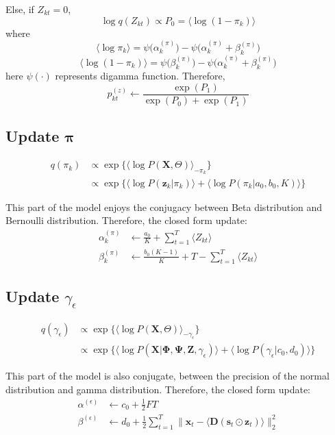 \documentclass[11pt]{article} %
\begin{document}
Else, if $Z_{kt} = 0$,
\[
\log q(Z_{kt}) \propto P_0 = \langle \log (1-\pi_k) \rangle
\]
where 
\[
\langle \log \pi_k \rangle = \psi\big(\alpha_k^{(\pi)}\big) - \psi\big(\alpha_k^{(\pi)} + \beta_k^{(\pi)}\big)
\]
\[
\langle \log(1- \pi_k) \rangle = \psi\big(\beta_k^{(\pi)}\big) - \psi\big(\alpha_k^{(\pi)} + \beta_k^{(\pi)}\big)
\]
here $\psi(\cdot)$ represents digamma function. 
Therefore, 
\[
p_{kt}^{(z)} \leftarrow \frac{\exp(P_1)}{\exp(P_0) + \exp(P_1)}
\]

\subsection{Update $\bm{\pi}$}
\begin{align*}
q(\pi_k) &\propto \exp\{\langle\log P(\mathbf{X}, \Theta)\rangle_{-\pi_k}\}\\
&\propto \exp\{\langle \log P(\bm{z}_{k} | \pi_k) \rangle + \langle \log P(\pi_k | a_0, b_0, K) \rangle \}
\end{align*}

This part of the model enjoys the conjugacy between Beta distribution and Bernoulli distribution. Therefore, the closed form update:
\begin{align*}
\alpha_k^{(\pi)} &\leftarrow \frac{a_0}{K} + \sum_{t=1}^T \langle Z_{kt} \rangle\\
\beta_k^{(\pi)} &\leftarrow \frac{b_0 (K-1)}{K} + T - \sum_{t=1}^T \langle Z_{kt} \rangle
\end{align*}

\subsection{Update $\gamma_\epsilon$}
\begin{align*}
q(\gamma_\epsilon) &\propto \exp\{\langle\log P(\mathbf{X}, \Theta)\rangle_{-\gamma_\epsilon}\}\\
&\propto \exp\{\langle \log P(\mathbf{X} | \mathbf{\Phi}, \mathbf{\Psi}, \mathbf{Z},  \gamma_\epsilon)\rangle + \langle \log P(\gamma_\epsilon | c_0, d_0) \rangle \}
\end{align*}

This part of the model is also conjugate, between the precision of the normal distribution and gamma distribution. Therefore, the closed form update:
\begin{align*}
\alpha^{(\epsilon)} &\leftarrow  c_0 + \frac{1}{2} FT\\
\beta^{(\epsilon)} &\leftarrow d_0 + \frac{1}{2}\sum_{t=1}^T \parallel \bm{x}_t - \langle \mathbf{D} ( \bm{s}_t \odot  \bm{z}_t ) \rangle \parallel_2^2
\end{align*}
\end{document}
